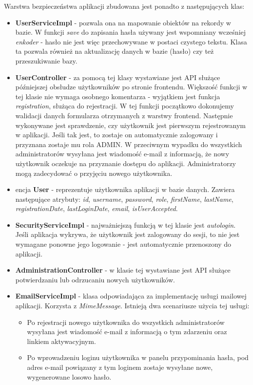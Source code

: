\documentclass[11pt]{article}
\begin{document}
Warstwa bezpieczeństwa aplikacji zbudowana jest ponadto z następujących klas:
\begin{itemize}
\item \textbf{UserServiceImpl} - pozwala ona na mapowanie obiektów na rekordy w bazie. W funkcji \emph{save} do zapisania hasła używany jest wspomniany wcześniej \emph{enkoder} - hasło nie jest więc przechowywane w postaci czystego tekstu. Klasa ta pozwala również na aktualizację danych w bazie (hasło) czy też przeszukiwanie bazy.
\item \textbf{UserController} - za pomocą tej klasy wystawiane jest API służące późniejszej obsłudze użytkowników po stronie frontendu. Większość funkcji w tej klasie nie wymaga osobnego komentarza - wyjątkiem jest funkcja \emph{registration}, służąca do rejestracji. W tej funkcji początkowo dokonujemy walidacji danych formularza otrzymanych z warstwy frontend. Następnie wykonywane jest sprawdzenie, czy użytkownik jest pierwszym rejestrowanym w aplikacji. Jeśli tak jest, to zostaje on automatycznie zalogowany i przyznana zostaje mu rola ADMIN. W przeciwnym wypadku do wszystkich administratorów wysyłana jest wiadomość e-mail z informacją, że nowy użytkownik oczekuje na przyznanie dostępu do aplikacji. Administratorzy mogą zadecydować o przyjęciu nowego użytkownika.
\item encja \textbf{User} - reprezentuje użytkownika aplikacji w bazie danych. Zawiera następujące atrybuty: \emph{id}, \emph{username}, \emph{password}, \emph{role}, \emph{firstName}, \emph{lastName}, \emph{registrationDate}, \emph{lastLoginDate}, \emph{email}, \emph{isUserAccepted}.
\item \textbf{SecurityServiceImpl} - najważniejszą funkcją w tej klasie jest \emph{autologin}. Jeśli aplikacja wykrywa, że użytkownik jest zalogowany do sesji, to nie jest wymagane ponowne jego logowanie - jest automatycznie przenoszony do aplikacji.
\item \textbf{AdministrationController} - w klasie tej wystawiane jest API służące potwierdzaniu lub odrzucaniu nowych użytkowników.
\item \textbf{EmailServiceImpl} - klasa odpowiadająca za implementację usługi mailowej aplikacji. Korzysta z \emph{MimeMessage}. Istnieją dwa scenariusze użycia tej usługi: 
\begin{itemize}
\item Po rejestracji nowego użytkownika do wszystkich administratorów wysyłana jest wiadomość e-mail z informacją o tym zdarzeniu oraz linkiem aktywacyjnym. 
\item Po wprowadzeniu loginu użytkownika w panelu przypominania hasła, pod adres e-mail powiązany z tym loginem zostaje wysyłane nowe, wygenerowane losowo hasło.
\end{itemize}
\end{itemize}
\end{document}
